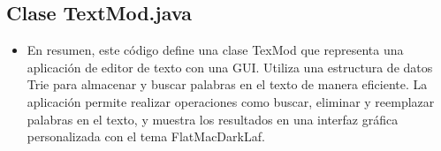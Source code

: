 \documentclass{article}
\begin{document}
		

\subsection{Clase TextMod.java}
\begin{itemize}	
	\item En resumen, este código define una clase TexMod que representa una aplicación de editor de texto con una GUI. Utiliza una estructura de datos Trie para almacenar y buscar palabras en el texto de manera eficiente. La aplicación permite realizar operaciones como buscar, eliminar y reemplazar palabras en el texto, y muestra los resultados en una interfaz gráfica personalizada con el tema FlatMacDarkLaf.
\end{itemize}	
	
\end{document}
